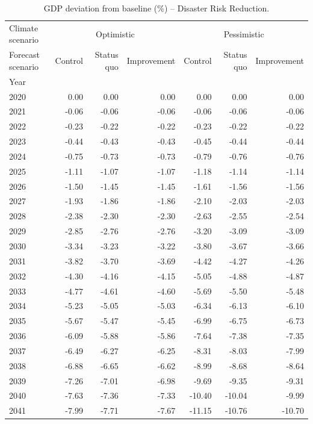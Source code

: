 \begin{table}
\caption{GDP deviation from baseline (\%) -- Disaster Risk Reduction.}
\label{tab:results_DRR_baseline_rel}
\centering
\begin{tabular}{lrrrrrr}
\toprule
Climate scenario & \multicolumn{3}{c}{Optimistic} & \multicolumn{3}{c}{Pessimistic} \\
Forecast scenario & Control & Status quo & Improvement & Control & Status quo & Improvement \\
Year &  &  &  &  &  &  \\
\midrule
2020 & 0.00 & 0.00 & 0.00 & 0.00 & 0.00 & 0.00 \\
2021 & -0.06 & -0.06 & -0.06 & -0.06 & -0.06 & -0.06 \\
2022 & -0.23 & -0.22 & -0.22 & -0.23 & -0.22 & -0.22 \\
2023 & -0.44 & -0.43 & -0.43 & -0.45 & -0.44 & -0.44 \\
2024 & -0.75 & -0.73 & -0.73 & -0.79 & -0.76 & -0.76 \\
2025 & -1.11 & -1.07 & -1.07 & -1.18 & -1.14 & -1.14 \\
2026 & -1.50 & -1.45 & -1.45 & -1.61 & -1.56 & -1.56 \\
2027 & -1.93 & -1.86 & -1.86 & -2.10 & -2.03 & -2.03 \\
2028 & -2.38 & -2.30 & -2.30 & -2.63 & -2.55 & -2.54 \\
2029 & -2.85 & -2.76 & -2.76 & -3.20 & -3.09 & -3.09 \\
2030 & -3.34 & -3.23 & -3.22 & -3.80 & -3.67 & -3.66 \\
2031 & -3.82 & -3.70 & -3.69 & -4.42 & -4.27 & -4.26 \\
2032 & -4.30 & -4.16 & -4.15 & -5.05 & -4.88 & -4.87 \\
2033 & -4.77 & -4.61 & -4.60 & -5.69 & -5.50 & -5.48 \\
2034 & -5.23 & -5.05 & -5.03 & -6.34 & -6.13 & -6.10 \\
2035 & -5.67 & -5.47 & -5.45 & -6.99 & -6.75 & -6.73 \\
2036 & -6.09 & -5.88 & -5.86 & -7.64 & -7.38 & -7.35 \\
2037 & -6.49 & -6.27 & -6.25 & -8.31 & -8.03 & -7.99 \\
2038 & -6.88 & -6.65 & -6.62 & -8.99 & -8.68 & -8.64 \\
2039 & -7.26 & -7.01 & -6.98 & -9.69 & -9.35 & -9.31 \\
2040 & -7.63 & -7.36 & -7.33 & -10.40 & -10.04 & -9.99 \\
2041 & -7.99 & -7.71 & -7.67 & -11.15 & -10.76 & -10.70 \\

\end{tabular}
\end{table}
